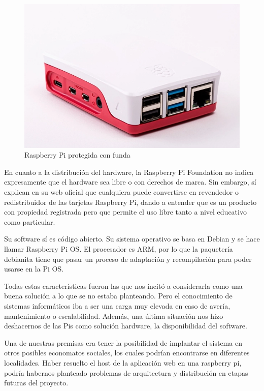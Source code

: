 \begin{figure}[h]
\centering
\includegraphics[scale=0.4]{archivos/rpi4case.png}
\caption{Raspberry Pi protegida con funda}
\label{fig:rpi4case}
\end{figure}
\par En cuanto a la distribución del hardware, la Raspberry Pi Foundation no indica expresamente que el hardware sea libre o con derechos de marca. Sin embargo, sí explican en su web oficial que cualquiera puede convertirse en revendedor o redistribuidor de las tarjetas Raspberry Pi, dando a entender que es un producto con propiedad registrada pero que permite el uso libre tanto a nivel educativo como particular.
\par Su software sí es código abierto. Su sistema operativo se basa en Debian y se hace llamar Raspberry Pi OS. El procesador es ARM, por lo que la paquetería debianita tiene que pasar un proceso de adaptación y recompilación para poder usarse en la Pi OS.
\par Todas estas características fueron las que nos incitó a considerarla como una buena solución a lo que se no estaba planteando. Pero el conocimiento de sistemas informáticos iba a ser una carga muy elevada en caso de avería, mantenimiento o escalabilidad. Además, una última situación nos hizo deshacernos de las Pis como solución hardware, la disponibilidad del software.
\par Una de nuestras premisas era tener la posibilidad de implantar el sistema en otros posibles economatos sociales, los cuales podrían encontrarse en diferentes localidades. Haber resuelto el host de la aplicación web en una raspberry pi, podría habernos planteado problemas de arquitectura y distribución en etapas futuras del proyecto.
